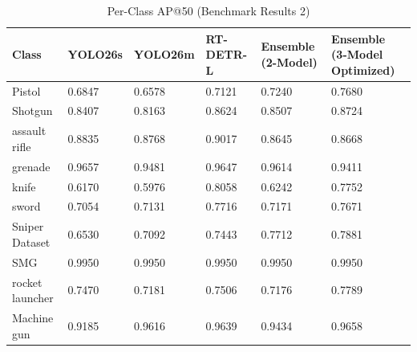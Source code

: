 \begin{table}
\caption{Per-Class AP@50 (Benchmark Results 2)}
\label{tab:per_class_2}
\begin{tabular}{llllll}
\toprule
Class & YOLO26s & YOLO26m & RT-DETR-L & Ensemble (2-Model) & Ensemble (3-Model Optimized) \\
\midrule
Pistol & 0.6847 & 0.6578 & 0.7121 & 0.7240 & 0.7680 \\
Shotgun & 0.8407 & 0.8163 & 0.8624 & 0.8507 & 0.8724 \\
assault rifle & 0.8835 & 0.8768 & 0.9017 & 0.8645 & 0.8668 \\
grenade & 0.9657 & 0.9481 & 0.9647 & 0.9614 & 0.9411 \\
knife & 0.6170 & 0.5976 & 0.8058 & 0.6242 & 0.7752 \\
sword & 0.7054 & 0.7131 & 0.7716 & 0.7171 & 0.7671 \\
Sniper Dataset & 0.6530 & 0.7092 & 0.7443 & 0.7712 & 0.7881 \\
SMG & 0.9950 & 0.9950 & 0.9950 & 0.9950 & 0.9950 \\
rocket launcher & 0.7470 & 0.7181 & 0.7506 & 0.7176 & 0.7789 \\
Machine gun & 0.9185 & 0.9616 & 0.9639 & 0.9434 & 0.9658 \\
\bottomrule
\end{tabular}
\end{table}
